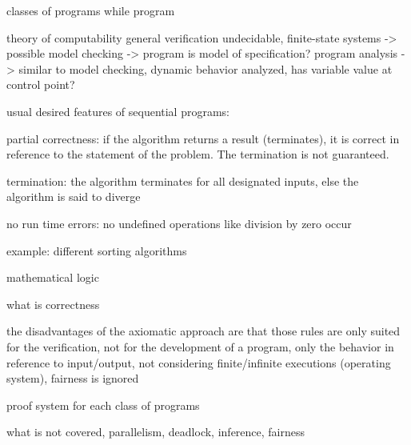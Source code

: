 classes of programs
while program

theory of computability general verification undecidable, finite-state systems -> possible
model checking -> program is model of specification?
program analysis -> similar to model checking, dynamic behavior analyzed, has variable value at control point?




usual desired features of sequential programs:

partial correctness: if the algorithm returns a result (terminates),
it is correct in reference to the statement of the problem. The termination
is not guaranteed.

termination: the algorithm terminates for all designated inputs, else
the algorithm is said to diverge

no run time errors: no undefined operations like division by zero
occur

example: different sorting algorithms

mathematical logic

what is correctness

the disadvantages of the axiomatic approach are that those rules are
only suited for the verification, not for the development of a program,
only the behavior in reference to input/output, not considering finite/infinite
executions (operating system), fairness is ignored

proof system for each class of programs


%

what is not covered, parallelism, deadlock, inference, fairness